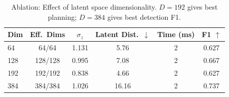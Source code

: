 \begin{table}[t]
\centering
\caption{Ablation: Effect of latent space dimensionality. $D{=}192$ gives best planning; $D{=}384$ gives best detection F1.}
\label{tab:ablation_dim}
\begin{tabular}{lccccc}
\toprule
Dim & Eff.\ Dims & $\sigma_z$ & Latent Dist.\ $\downarrow$ & Time (ms) & F1 $\uparrow$ \\
\midrule
  64 & 64/64 & 1.131 & 5.76 & 2 & 0.627 \\
  128 & 128/128 & 0.995 & 7.08 & 2 & 0.667 \\
  192 & 192/192 & 0.838 & 4.66 & 2 & 0.627 \\
  384 & 384/384 & 1.026 & 16.16 & 2 & 0.737 \\
\bottomrule
\end{tabular}
\end{table}
